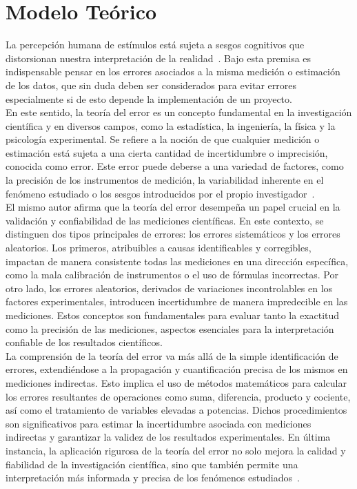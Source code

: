 \documentclass[runningheads]{llncs}
\begin{document}
    \section*{\centering Modelo Teórico}
    La percepción humana de estímulos está sujeta a sesgos cognitivos que distorsionan nuestra interpretación de la realidad~\cite{firestone2016cognition}. Bajo esta premisa es indispensable pensar en los errores asociados a la misma medición o estimación de los datos, que sin duda deben ser considerados para evitar errores especialmente si de esto depende la implementación de un proyecto.\\
    En este sentido, la teoría del error es un concepto fundamental en la investigación científica y en diversos campos, como la estadística, la ingeniería, la física y la psicología experimental. Se refiere a la noción de que cualquier medición o estimación está sujeta a una cierta cantidad de incertidumbre o imprecisión, conocida como error. 
    Este error puede deberse a una variedad de factores, como la precisión de los instrumentos de medición, la variabilidad inherente en el fenómeno estudiado o los sesgos introducidos por el propio investigador~\cite{Gonzalez}.\\
    El mismo autor afirma que la teoría del error desempeña un papel crucial en la validación y confiabilidad de las mediciones científicas. En este contexto, se distinguen dos tipos principales de errores: los errores sistemáticos y los errores aleatorios. Los primeros, atribuibles a causas identificables y corregibles, impactan de manera consistente todas las mediciones en una dirección específica, como la mala calibración de instrumentos o el uso de fórmulas incorrectas. Por otro lado, los errores aleatorios, derivados de variaciones incontrolables en los factores experimentales, introducen incertidumbre de manera impredecible en las mediciones. Estos conceptos son fundamentales para evaluar tanto la exactitud como la precisión de las mediciones, aspectos esenciales para la interpretación confiable de los resultados científicos.\\
    La comprensión de la teoría del error va más allá de la simple identificación de errores, extendiéndose a la propagación y cuantificación precisa de los mismos en mediciones indirectas. Esto implica el uso de métodos matemáticos para calcular los errores resultantes de operaciones como suma, diferencia, producto y cociente, así como el tratamiento de variables elevadas a potencias. Dichos procedimientos son significativos para estimar la incertidumbre asociada con mediciones indirectas y garantizar la validez de los resultados experimentales. En última instancia, la aplicación rigurosa de la teoría del error no solo mejora la calidad y fiabilidad de la investigación científica, sino que también permite una interpretación más informada y precisa de los fenómenos estudiados~\cite{medina2018propagacion}. \\
    
\end{document}
